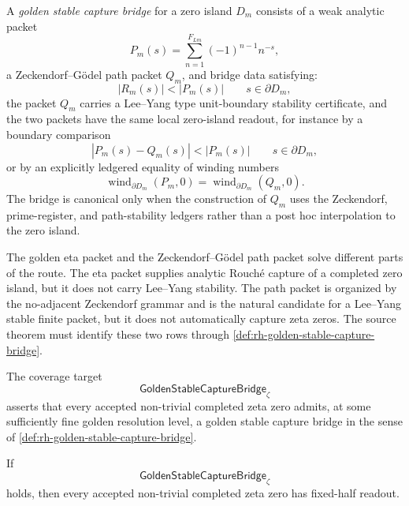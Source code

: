 \begin{definition}
\label{def:rh-golden-stable-capture-bridge}
A \emph{golden stable capture bridge} for a zero island $D_m$ consists
of a weak analytic packet
$$
P_m(s)=\sum_{n=1}^{F_{Lm}}(-1)^{n-1}n^{-s},
$$
a Zeckendorf--G\"odel path packet $Q_m$, and bridge data satisfying:
$$
|R_m(s)|<|P_m(s)|
\qquad
s\in\partial D_m,
$$
the packet $Q_m$ carries a Lee--Yang type unit-boundary stability
certificate, and the two packets have the same local zero-island
readout, for instance by a boundary comparison
$$
|P_m(s)-Q_m(s)|<|P_m(s)|
\qquad
s\in\partial D_m,
$$
or by an explicitly ledgered equality of winding numbers
$$
\operatorname{wind}_{\partial D_m}(P_m,0)
=
\operatorname{wind}_{\partial D_m}(Q_m,0).
$$
The bridge is canonical only when the construction of $Q_m$ uses the
Zeckendorf, prime-register, and path-stability ledgers rather than a
post hoc interpolation to the zero island.
\end{definition}

\begin{principle}
\label{prin:rh-golden-weak-stable-separate-rows}
The golden eta packet and the Zeckendorf--G\"odel path packet solve
different parts of the route. The eta packet supplies analytic
Rouch\'e capture of a completed zero island, but it does not carry
Lee--Yang stability. The path packet is organized by the no-adjacent
Zeckendorf grammar and is the natural candidate for a Lee--Yang stable
finite packet, but it does not automatically capture zeta zeros. The
source theorem must identify these two rows through
\autoref{def:rh-golden-stable-capture-bridge}.
\end{principle}

\begin{definition}
\label{def:rh-golden-stable-capture-coverage}
The coverage target
$$
\mathsf{GoldenStableCaptureBridge}_{\zeta}
$$
asserts that every accepted non-trivial completed zeta zero admits, at
some sufficiently fine golden resolution level, a golden stable capture
bridge in the sense of
\autoref{def:rh-golden-stable-capture-bridge}.
\end{definition}

\begin{theorem}
\label{thm:rh-golden-stable-capture-coverage-fixed-half}
If
$$
\mathsf{GoldenStableCaptureBridge}_{\zeta}
$$
holds, then every accepted non-trivial completed zeta zero has fixed-half
readout.
\end{theorem}

